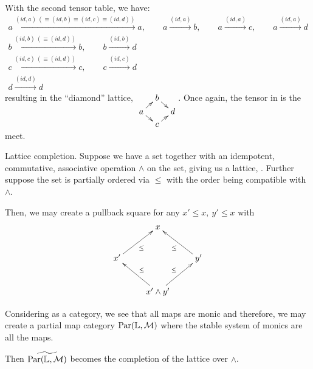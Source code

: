 With the second tensor table, we have:
\begin{align*}
  a \xrightarrow{(id,a) \ (\equiv (id, b) \equiv (id,c) \equiv (id,d))} a, \qquad
    a \xrightarrow{(id,a)} b, \qquad a \xrightarrow{(id, a)} c , \qquad a \xrightarrow{(id, a)} d \\
  b \xrightarrow{(id,b) \ (\equiv (id, d))} b ,  \qquad b \xrightarrow{(id,b)} d\\
  c \xrightarrow{(id, c) \ (\equiv (id, d))} c,   \qquad c \xrightarrow{(id,c)} d\\
  d \xrightarrow{(id,d)} d
\end{align*}
resulting in the ``diamond'' lattice,
$
  \xymatrix @R=3pt @C=8pt {
    & b \ar[dr]\\
    a \ar[ur] \ar[dr] & &d\\
    & c \ar[ur]
  }
$. Once again, the tensor in \D is the meet.

\begin{example}{Lattice completion.}\label{example:lattice_completion}
  Suppose we have a set together with an idempotent, commutative, associative operation $\wedge$ on
  the set, giving us a lattice, \Lat. Further suppose the set is partially ordered via $\le$ with
  the order being compatible with $\wedge$.

  Then, we may create a pullback square for any $x' \le x,\ y' \le x$ with
  \[
    \xymatrix{
      &x\\
      x' \ar[ur]_{\le} & & y' \ar[ul]^{\le}\\
      &x'\wedge y'  \ar[ul]_{\le} \ar[ur]^{\le}
    }
  \]

  Considering \Lat as a category, we see that all maps are monic and therefore, we may create a
  partial map category $\text{Par}(\mathbb{L},\mathcal{M})$ where the stable system of monics are all the maps.

  Then $\widetilde{\text{Par}(\mathbb{L},\mathcal{M})}$ becomes the completion of the lattice over $\wedge$.
\end{example}





